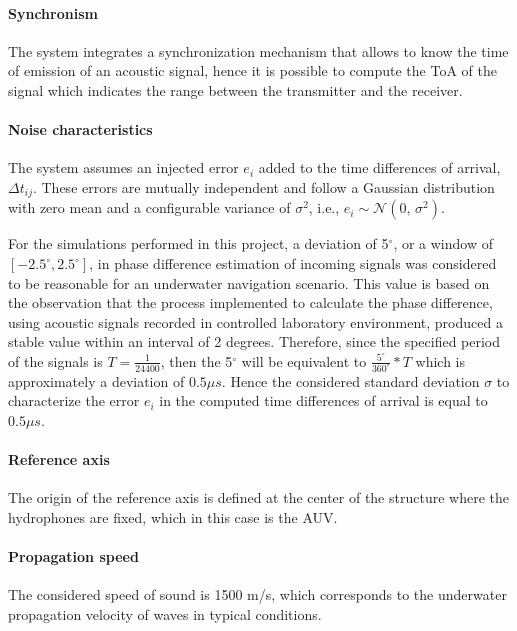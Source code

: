 \paragraph{Synchronism} The system integrates a synchronization mechanism that allows to know the time of emission of an acoustic signal, hence it is possible to compute the ToA of the signal which indicates the range between the transmitter and the receiver.

\paragraph{Noise characteristics} The system assumes an injected error $e_i$ added to the time differences of arrival, $ \Delta t_{ij}$. These errors are mutually independent and follow a Gaussian distribution with zero mean and a configurable variance of $\sigma^{2}$, i.e., $e_i \sim \mathcal{N}(0,\,\sigma^{2})$. 

For the simulations performed in this project, a deviation of 5$^{\circ}$, or a window of $[-2.5^{\circ},2.5^{\circ}]$, in phase difference estimation of incoming signals was considered to be reasonable for an underwater navigation scenario. This value is based on the observation that the process implemented to calculate the phase difference, using acoustic signals recorded in controlled laboratory environment, produced a stable value within an interval of 2 degrees. Therefore, since the specified period of the signals is $T = \frac{1}{24400}$, then the 5$^{\circ}$ will be equivalent to $\frac{5^{\circ}}{360^{\circ}}*T$ which is approximately a deviation of $0.5\mu s$. Hence the considered standard deviation $\sigma$ to characterize the error $e_i$ in the computed time differences of arrival is equal to $0.5\mu s$.

\paragraph{Reference axis} The origin of the reference axis is defined at the center of the structure where the hydrophones are fixed, which in this case is the AUV.

\paragraph{Propagation speed} The considered speed of sound is 1500 m/s, which corresponds to the underwater propagation velocity of waves in typical conditions.

